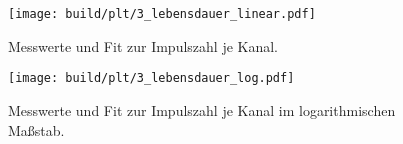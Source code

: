 \begin{figure}
    \centering
    \texttt{[image: build/plt/3\_lebensdauer\_linear.pdf]}
    \caption{Messwerte und Fit zur Impulszahl je Kanal.}
    \label{fig:plt:3_lebensdauer_linear}
\end{figure}

\begin{figure}
    \centering
    \texttt{[image: build/plt/3\_lebensdauer\_log.pdf]}
    \caption{Messwerte und Fit zur Impulszahl je Kanal im logarithmischen Maßstab.}
    \label{fig:plt:3_lebensdauer_log}
\end{figure}
